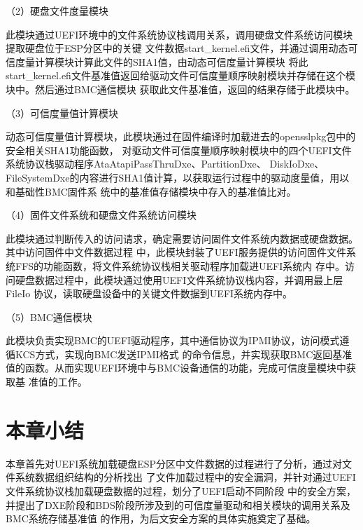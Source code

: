 \par （2）硬盘文件度量模块
\par 此模块通过UEFI环境中的文件系统协议栈调用关系，调用硬盘文件系统访问模块提取硬盘位于ESP分区中的关键
文件数据start\_kernel.efi文件，并通过调用动态可信度量计算模块计算此文件的SHA1值，由动态可信度量计算模块
将此start\_kernel.efi文件基准值返回给驱动文件可信度量顺序映射模块并存储在这个模块中。然后通过BMC通信模块
获取此文件基准值，返回的结果存储于此模块中。

\par （3）可信度量值计算模块
\par 动态可信度量值计算模块，此模块通过在固件编译时加载进去的opensslpkg包中的安全相关SHA1功能函数，
对驱动文件可信度量顺序映射模块中的四个UEFI文件系统协议栈驱动程序AtaAtapiPassThruDxe、PartitionDxe、
DiskIoDxe、FileSystemDxe的内容进行SHA1值计算，以获取运行过程中的驱动度量值，用以和基础性BMC固件系
统中的基准值存储模块中存入的基准值比对。

\par （4）固件文件系统和硬盘文件系统访问模块
\par 此模块通过判断传入的访问请求，确定需要访问固件文件系统内数据或硬盘数据。其中访问固件中文件数据过程
中，此模块封装了UEFI服务提供的访问固件文件系统FFS的功能函数，将文件系统协议栈相关驱动程序加载进UEFI系统内
存中。访问硬盘数据过程中，此模块通过使用UEFI文件系统协议栈内容，并调用最上层FileIo
协议，读取硬盘设备中的关键文件数据到UEFI系统内存中。

\par （5）BMC通信模块
\par 此模块负责实现BMC的UEFI驱动程序，其中通信协议为IPMI协议，访问模式遵循KCS方式，实现向BMC发送IPMI格式
的命令信息，并实现获取BMC返回基准值的函数。从而实现UEFI环境中与BMC设备通信的功能，完成可信度量模块中获取基
准值的工作。

%
%
\section{本章小结}
本章首先对UEFI系统加载硬盘ESP分区中文件数据的过程进行了分析，通过对文件系统数据组织结构的分析找出
了文件加载过程中的安全漏洞，并针对通过UEFI文件系统协议栈加载硬盘数据的过程，划分了UEFI启动不同阶段
中的安全方案，并提出了DXE阶段和BDS阶段所涉及到的可信度量驱动和相关模块的调用关系及BMC系统存储基准值
的作用，为后文安全方案的具体实施奠定了基础。

\bjutclearpage
